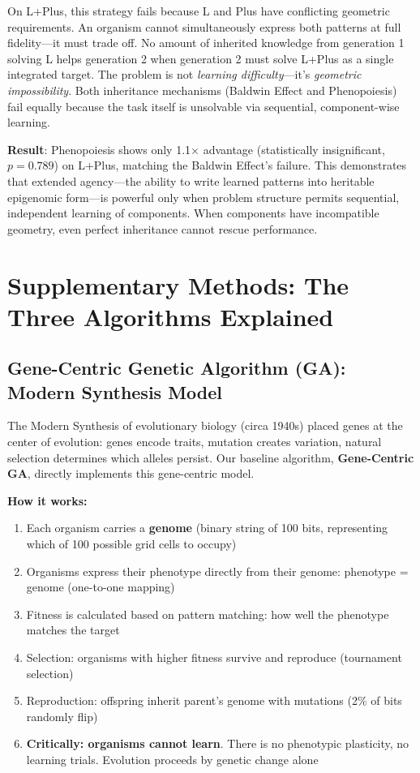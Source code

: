 \documentclass[12pt]{article}
\begin{document}
On L+Plus, this strategy fails because L and Plus have conflicting geometric requirements. An organism cannot simultaneously express both patterns at full fidelity—it must trade off. No amount of inherited knowledge from generation 1 solving L helps generation 2 when generation 2 must solve L+Plus as a single integrated target. The problem is not \textit{learning difficulty}—it's \textit{geometric impossibility}. Both inheritance mechanisms (Baldwin Effect and Phenopoiesis) fail equally because the task itself is unsolvable via sequential, component-wise learning.

\textbf{Result}: Phenopoiesis shows only 1.1$\times$ advantage (statistically insignificant, $p = 0.789$) on L+Plus, matching the Baldwin Effect's failure. This demonstrates that extended agency—the ability to write learned patterns into heritable epigenomic form—is powerful only when problem structure permits sequential, independent learning of components. When components have incompatible geometry, even perfect inheritance cannot rescue performance.

\newpage

\section*{Supplementary Methods: The Three Algorithms Explained}

\subsection*{Gene-Centric Genetic Algorithm (GA): Modern Synthesis Model}

The Modern Synthesis of evolutionary biology (circa 1940s) placed genes at the center of evolution: genes encode traits, mutation creates variation, natural selection determines which alleles persist. Our baseline algorithm, \textbf{Gene-Centric GA}, directly implements this gene-centric model.

\textbf{How it works:}
\begin{enumerate}
\item Each organism carries a \textbf{genome} (binary string of 100 bits, representing which of 100 possible grid cells to occupy)
\item Organisms express their phenotype directly from their genome: phenotype = genome (one-to-one mapping)
\item Fitness is calculated based on pattern matching: how well the phenotype matches the target
\item Selection: organisms with higher fitness survive and reproduce (tournament selection)
\item Reproduction: offspring inherit parent's genome with mutations (2\% of bits randomly flip)
\item \textbf{Critically: organisms cannot learn}. There is no phenotypic plasticity, no learning trials. Evolution proceeds by genetic change alone
\end{enumerate}
\end{document}
